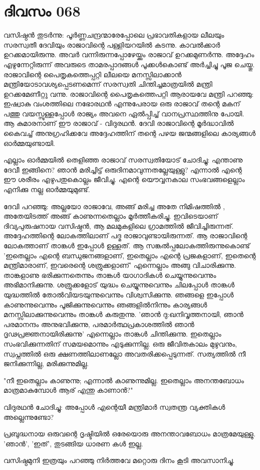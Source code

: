 \newpage
\section{ദിവസം 068}


വസിഷ്ഠന്‍ തുടര്‍ന്നു: പൂര്‍ണ്ണചന്ദ്രന്മാരേപ്പോലെ പ്രഭാവതികളായ ലീലയും സരസ്വതീ ദേവിയും രാജാവിന്റെ പള്ളിയറയില്‍ കടന്നു. കാവല്‍ക്കാര്‍ ഉറക്കമായിരുന്നു. അവര്‍ വന്നിരുന്നപ്പോഴേയ്ക്കും രാജാവ്‌ ഉറക്കമുണര്‍ന്നു. അദ്ദേഹം എഴുന്നേറ്റിരുന്ന് അവരുടെ താമരപ്പാദങ്ങള്‍ പൂക്കള്‍കൊണ്ട്‌ അര്‍ച്ചിച്ചു പൂജ ചെയ്തു. രാജാവിന്റെ പൈതൃകത്തെപ്പറ്റി ലീലയെ മനസ്സിലാക്കാന്‍ മന്ത്രിയോടാവശ്യപ്പെടണമെന്ന് സരസ്വതി ചിന്തിച്ചമാത്രയില്‍ മന്ത്രി ഉറക്കമേണീറ്റു വന്നു. രാജാവിന്റെ പൈതൃകത്തെപറ്റി ആരായവേ മന്ത്രി പറഞ്ഞു: ഇഷ്വാകു വംശത്തിലെ നഭോരഥന്‍ എന്നുപേരായ ഒരു രാജാവ്‌ തന്റെ മകന്‌ പത്തു വയസ്സുള്ളപ്പോള്‍ രാജ്യം അവനെ ഏല്‍പ്പിച്ച്‌ വാനപ്രസ്ഥത്തിനു പോയി. ആ കുമാരനാണ്‌ ഈ രാജാവ്‌ - വിദുരഥന്‍. ദേവി രാജാവിന്റെ മൂര്‍ദ്ധാവില്‍ കൈവച്ച്‌ അനുഗ്രഹിക്കവേ അദ്ദേഹത്തിന്‌ തന്റെ പഴയ ജന്മങ്ങളിലെ കാര്യങ്ങള്‍ ഓര്‍മ്മയുണ്ടായി. 

എല്ലാം ഓര്‍മ്മയില്‍ തെളിഞ്ഞ രാജാവ്‌ സരസ്വതിയോട്‌ ചോദിച്ചു: എന്താണു ദേവീ ഇങ്ങിനെ? ഞാന്‍ മരിച്ചിട്ട്‌ ഒരുദിനമാവുന്നതല്ലേയുള്ളു? എന്നാല്‍ എന്റെ ഈ ശരീരം എഴുപതുകൊല്ലം ജീവിച്ചു. എന്റെ യൌവ്വനകാല സംഭവങ്ങളെല്ലാം എനിക്കു നല്ല ഓര്‍മ്മയുമുണ്ട്‌.

ദേവി പറഞ്ഞു: അല്ലയോ രാജാവേ, അങ്ങ്‌ മരിച്ച അതേ നിമിഷത്തില്‍ , അതേയിടത്ത്‌ അങ്ങ്‌ കാണുന്നതെല്ലാം മൂര്‍ത്തീകരിച്ചു. ഇവിടെയാണ്‌ ദിവ്യപുരുഷനായ വസിഷ്ഠന്‍, ആ മലമുകളിലെ ഗ്രാമത്തില്‍ ജീവിച്ചിരുന്നത്‌. അദ്ദേഹത്തിന്റെ ലോകത്തിലാണ്‌ പദ്മ രാജാവുണ്ടായിരുന്നത്‌. ആ രാജാവിന്റെ ലോകത്താണ്‌ താങ്കള്‍ ഇപ്പോള്‍ ഉള്ളത്‌. ആ സങ്കല്‍പ്പലോകത്തിരുന്നുകൊണ്ട്‌ 'ഇതെല്ലാം എന്റെ ബന്ധുജനങ്ങളാണ്‌, ഇതെല്ലാം എന്റെ പ്രജകളാണ്‌, ഇതെന്റെ മന്ത്രിമാരാണ്‌, ഇവരെന്റെ ശത്രുക്കളാണ്‌' എന്നെല്ലാം അങ്ങു വിചാരിക്കുന്നു. താങ്കളാണു ഭരിക്കുന്നതെന്നും താങ്കള്‍ യാഗാദികള്‍ ചെയ്യുന്നുവെന്നും അഭിമാനിക്കുന്നു. ശത്രുക്കളോട്‌ യുദ്ധം ചെയ്യുന്നുവെന്നും ചിലപ്പോള്‍ താങ്കള്‍ യുദ്ധത്തില്‍ തോല്‍വിയടയുന്നുവെന്നും വിശ്വസിക്കുന്നു. ഞങ്ങളെ ഇപ്പോള്‍ കാണുന്നുവെന്നും പൂജിക്കുന്നുവെന്നും ഞങ്ങളില്‍നിന്നും കാര്യങ്ങള്‍ മനസ്സിലാക്കുന്നുവെന്നും താങ്കള്‍ കരുതുന്നു. 'ഞാന്‍ ദു:ഖനിവൃത്തനായി, ഞാന്‍ പരമാനന്ദം അനുഭവിക്കുന്നു, പരമാര്‍ത്ഥപ്രകാശത്തില്‍ ഞാന്‍ ദൃഢപ്രജ്ഞനായിരിക്കുന്നു' എന്നെല്ലാം താങ്കള്‍ ചിന്തിക്കുന്നു. ഇതെല്ലാം സംഭവിക്കുന്നതിന്‌ സമയമൊന്നും എടുക്കുന്നില്ല. ഒരു ജീവിതകാലം മുഴുവനും, സ്വപ്നത്തില്‍ ഒരു ക്ഷണത്തിലാണല്ലോ അവതരിക്കപ്പെടുന്നത്‌. സത്യത്തില്‍ നീ ജനിക്കുന്നില്ല, മരിക്കുന്നുമില്ല.

"നീ ഇതെല്ലാം കാണുന്നു; എന്നാല്‍ കാണുന്നുമില്ല. ഇതെല്ലാം അനന്തബോധം മാത്രമാകുമ്പോള്‍ ആര്‌ എന്തു കാണാന്‍?"

വിദുരഥന്‍ ചോദിച്ചു: അപ്പോള്‍ എന്റെയീ മന്ത്രിമാര്‍ സ്വതന്ത്ര വ്യക്തികള്‍ അല്ലെന്നുണ്ടോ?

പ്രബുദ്ധനായ ഒരുവന്റെ ദൃഷ്ടിയില്‍ ഒരേയൊരു അനന്താവബോധം മാത്രമേയുള്ളു. 'ഞാന്‍', 'ഇത്‌', തുടങ്ങിയ ധാരണ   കള്‍ ഇല്ല.

വസിഷ്ഠമുനി ഇത്രയും പറഞ്ഞു നിര്‍ത്തവേ മറ്റൊരു ദിനം കൂടി അവസാനിച്ചു.

